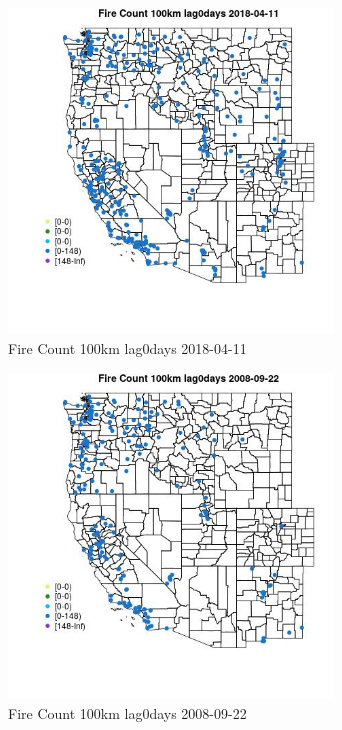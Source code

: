 \begin{figure} 
\centering  
\includegraphics[width=0.77\textwidth]{Code_Outputs/Report_ML_input_PM25_Step4_part_e_de_duplicated_aves_compiled_2019-05-18wNAs_MapObsFire_Count_100km_lag0days2018-04-11.jpg} 
\caption{\label{fig:Report_ML_input_PM25_Step4_part_e_de_duplicated_aves_compiled_2019-05-18wNAsMapObsFire_Count_100km_lag0days2018-04-11}Fire Count 100km lag0days 2018-04-11} 
\end{figure} 
 

\begin{figure} 
\centering  
\includegraphics[width=0.77\textwidth]{Code_Outputs/Report_ML_input_PM25_Step4_part_e_de_duplicated_aves_compiled_2019-05-18wNAs_MapObsFire_Count_100km_lag0days2008-09-22.jpg} 
\caption{\label{fig:Report_ML_input_PM25_Step4_part_e_de_duplicated_aves_compiled_2019-05-18wNAsMapObsFire_Count_100km_lag0days2008-09-22}Fire Count 100km lag0days 2008-09-22} 
\end{figure} 
 

